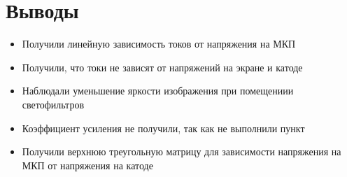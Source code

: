 \documentclass[a4paper,12pt]{article}
\theoremstyle{plain} %
\theoremstyle{definition} %
\theoremstyle{remark} %
\begin{document}
\section{Выводы}


\begin{itemize}
    \item Получили линейную зависимость токов от напряжения на МКП
    \item Получили, что токи не зависят от напряжений на экране и катоде
    \item Наблюдали уменьшение яркости изображения при 
    помещениии светофильтров
    \item Коэффициент усиления не получили, так как не выполнили пункт
    \item Получили верхнюю треугольную матрицу для зависимости напряжения на МКП от напряжения на катоде

\end{itemize}
\end{document}
